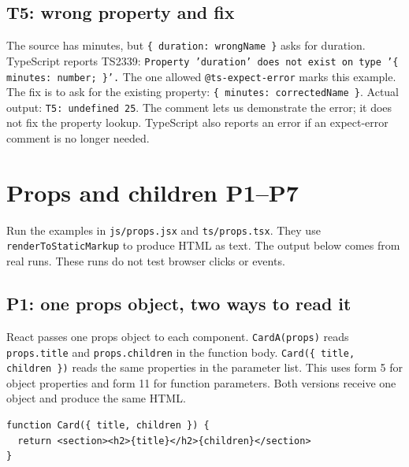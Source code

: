 \documentclass[
  10pt,
  a4paper,
]{article}
\begin{document}
\subsection{T5: wrong property and fix}\label{t5-wrong-property-and-fix}

The source has minutes, but
\texttt{\{ duration:\allowbreak{} wrongName \}} asks for duration.
TypeScript reports TS2339:
\texttt{Property 'duration' does not exist on type '\{ minutes:\allowbreak{} number; \}'.\allowbreak{}}
The one allowed \texttt{@ts-expect-error} marks this example. The fix is
to ask for the existing property:
\texttt{\{ minutes:\allowbreak{} correctedName \}}. Actual output:
\texttt{T5:\allowbreak{} undefined 25}. The comment lets us demonstrate
the error; it does not fix the property lookup. TypeScript also reports
an error if an expect-error comment is no longer needed.

\section{Props and children P1--P7}\label{props-and-children-p1p7}

Run the examples in \texttt{js/\allowbreak{}props.\allowbreak{}jsx} and
\texttt{ts/\allowbreak{}props.\allowbreak{}tsx}. They use
\texttt{renderToStaticMarkup} to produce HTML as text. The output below
comes from real runs. These runs do not test browser clicks or events.

\subsection{P1: one props object, two ways to read
it}\label{p1-one-props-object-two-ways-to-read-it}

React passes one props object to each component. \texttt{CardA(props)}
reads \texttt{props.\allowbreak{}title} and
\texttt{props.\allowbreak{}children} in the function body.
\texttt{Card(\{ title, children \})} reads the same properties in the
parameter list. This uses form 5 for object properties and form 11 for
function parameters. Both versions receive one object and produce the
same HTML.

\begin{minipage}{\linewidth}

\begin{lstlisting}
function Card({ title, children }) {
  return <section><h2>{title}</h2>{children}</section>
}
\end{lstlisting}

\end{minipage}\par
\end{document}
